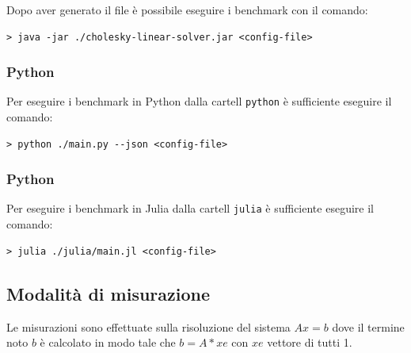 \documentclass[a4paper, 12pt]{article}
\begin{document}
            Dopo aver generato il file è possibile eseguire i benchmark con il
            comando:

\begin{lstlisting}[frame=single]
> java -jar ./cholesky-linear-solver.jar <config-file>
\end{lstlisting} 

        \subsubsection{Python}
            Per eseguire i benchmark in Python dalla cartell \texttt{python} è
            sufficiente eseguire il comando:

\begin{lstlisting}[frame=single]
> python ./main.py --json <config-file>
\end{lstlisting}

        \subsubsection{Python}
            Per eseguire i benchmark in Julia dalla cartell \texttt{julia} è
            sufficiente eseguire il comando:

\begin{lstlisting}[frame=single]
> julia ./julia/main.jl <config-file>
\end{lstlisting}

        \subsection{Modalità di misurazione}

            Le misurazioni sono effettuate sulla risoluzione del sistema $Ax = b$ dove il termine noto $b$ è calcolato
            in modo tale che $b = A*xe$ con $xe$ vettore di tutti 1.\\
\end{document}
